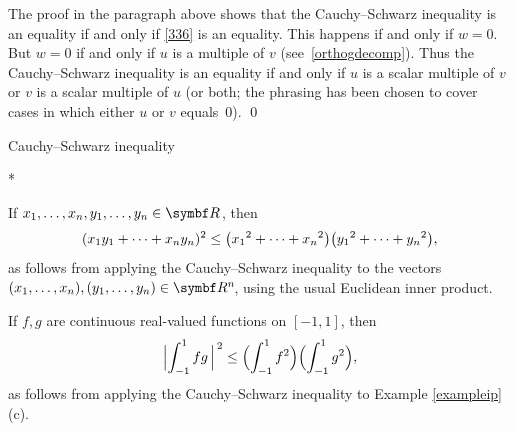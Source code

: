 
The proof in the paragraph above shows that the Cauchy--Schwarz inequality is an equality if and only if \ref{336} is an equality. This happens if and only if $w = 0$.  But $w=0$ if and only if $u$ is a multiple of $v$ (see~\ref{orthogdecomp}).  Thus the
Cauchy--Schwarz inequality is an equality if and only if $u$ is a scalar multiple of
$v$ or $v$ is a scalar multiple of $u$ (or both; the phrasing has been chosen to
cover cases in which either $u$ or $v$ equals~$0$).
\qed

\begin{example}[CS]{Cauchy--Schwarz inequality}
\begin{subtheorem}*
\item
If $x_1, \ldots, x_n, y_1, \ldots, y_n \in \R{}$, then
\[
( x_1 y_1 + \cdots + x_n y_n)^2 \le \paren[\big]{ {x_1}^{2} + \cdots + {x_n}^{2} } \paren[\big]{ {y_1}^{2} + \cdots + {y_n}^{2} },
\]
as follows from applying the Cauchy--Schwarz inequality to the vectors $(x_1, \ldots, x_n), (y_1, \ldots, y_n) \in \RR n$, using the usual Euclidean inner product.
\item
If $f, g$ are continuous real-valued functions on $[-1, 1]$, then
\[
\abs[\Big]{\int_{-1}^1 fg \,}^{\,2}
\le \paren[\Big]{ \int_{-1}^1 f^2 }
\paren[\Big]{ \int_{-1}^1 g^2 },
\]
as follows from applying the Cauchy--Schwarz inequality to Example \ref{exampleip}(c).
\end{subtheorem}
\vspace{-8bp}
\end{example}

